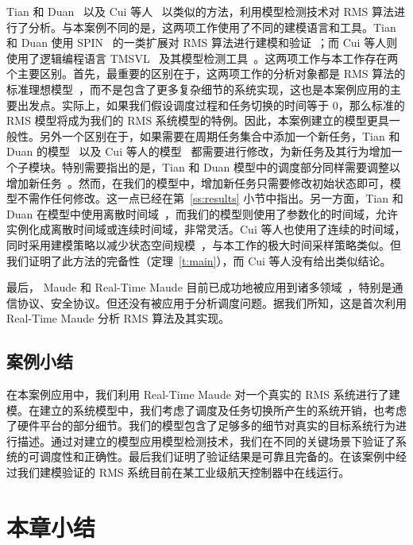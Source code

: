 Tian 和 Duan~\cite{TianD2011} 以及 Cui 等人~\cite{DBLP:conf/iceccs/CuiDT14} 以类似的方法，利用模型检测技术对 RMS 算法进行了分析。与本案例不同的是，这两项工作使用了不同的建模语言和工具。Tian 和 Duan 使用 SPIN~\cite{DBLP:journals/tse/Holzmann97} 的一类扩展对 RMS 算法进行建模和验证~\cite{TianD2011}；而 Cui 等人则使用了逻辑编程语言 TMSVL~\cite{DBLP:conf/icfem/HanDW12} 及其模型检测工具~\cite{DBLP:conf/iceccs/CuiDT14}。这两项工作与本工作存在两个主要区别。首先，最重要的区别在于，这两项工作的分析对象都是 RMS 算法的标准理想模型~\cite{DBLP:journals/jacm/LiuL73}，而不是包含了更多复杂细节的系统实现，这也是本案例应用的主要出发点。实际上，如果我们假设调度过程和任务切换的时间等于 0，那么标准的 RMS 模型将成为我们的 RMS 系统模型的特例。因此，本案例建立的模型更具一般性。另外一个区别在于，如果需要在周期任务集合中添加一个新任务，Tian 和 Duan 的模型~\cite{TianD2011} 以及 Cui 等人的模型~\cite{DBLP:conf/iceccs/CuiDT14} 都需要进行修改，为新任务及其行为增加一个子模块。特别需要指出的是，Tian 和 Duan 模型中的调度部分同样需要调整以增加新任务~\cite{TianD2011}。然而，在我们的模型中，增加新任务只需要修改初始状态即可，模型不需作任何修改。这一点已经在第~\ref{ss:results} 小节中指出。另一方面，Tian 和 Duan 在模型中使用离散时间域~\cite{TianD2011}，而我们的模型则使用了参数化的时间域，允许实例化成离散时间域或连续时间域，非常灵活。Cui 等人也使用了连续的时间域，同时采用建模策略以减少状态空间规模~\cite{DBLP:conf/iceccs/CuiDT14}，与本工作的极大时间采样策略类似。但我们证明了此方法的完备性（定理~\ref{t:main}），而 Cui 等人没有给出类似结论。

最后， Maude 和 Real-Time Maude 目前已成功地被应用到诸多领域~\cite{DBLP:journals/jlp/Meseguer12}，特别是通信协议、安全协议。但还没有被应用于分析调度问题。据我们所知，这是首次利用 Real-Time Maude 分析 RMS 算法及其实现。


\subsection{案例小结}
\label{s:conclusion} 
在本案例应用中，我们利用 Real-Time Maude 对一个真实的 RMS 系统进行了建模。在建立的系统模型中，我们考虑了调度及任务切换所产生的系统开销，也考虑了硬件平台的部分细节。我们的模型包含了足够多的细节对真实的目标系统行为进行描述。通过对建立的模型应用模型检测技术，我们在不同的关键场景下验证了系统的可调度性和正确性。最后我们证明了验证结果是可靠且完备的。在该案例中经过我们建模验证的 RMS 系统目前在某工业级航天控制器中在线运行。


\section{本章小结}

